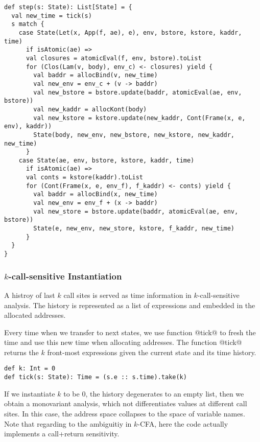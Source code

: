 \documentclass[acmsmall,review,anonymous]{acmart}\settopmatter{printfolios=true,printccs=false,printacmref=false}
\begin{document}
\begin{lstlisting}
def step(s: State): List[State] = {
  val new_time = tick(s)
  s match {
    case State(Let(x, App(f, ae), e), env, bstore, kstore, kaddr, time) 
      if isAtomic(ae) =>
      val closures = atomicEval(f, env, bstore).toList
      for (Clos(Lam(v, body), env_c) <- closures) yield {
        val baddr = allocBind(v, new_time)
        val new_env = env_c + (v -> baddr)
        val new_bstore = bstore.update(baddr, atomicEval(ae, env, bstore))
        val new_kaddr = allocKont(body)
        val new_kstore = kstore.update(new_kaddr, Cont(Frame(x, e, env), kaddr))
        State(body, new_env, new_bstore, new_kstore, new_kaddr, new_time)
      }
    case State(ae, env, bstore, kstore, kaddr, time) 
      if isAtomic(ae) =>
      val conts = kstore(kaddr).toList
      for (Cont(Frame(x, e, env_f), f_kaddr) <- conts) yield {
        val baddr = allocBind(x, new_time)
        val new_env = env_f + (x -> baddr)
        val new_store = bstore.update(baddr, atomicEval(ae, env, bstore))
        State(e, new_env, new_store, kstore, f_kaddr, new_time)
      }
  }
}
\end{lstlisting}

\subsubsection{$k$-call-sensitive Instantiation} \label{kcfainst}

A histroy of last $k$ call sites is served as time information in
$k$-call-sensitive analysis.
The history is represented as a list of expressions and embedded
in the allocated addresses.

Every time when we transfer to next states, we use function @tick@ to
fresh the time and use this new time when allocating addresses. The function
@tick@ returns the $k$ front-most expressions given the current state and its
time history.

\begin{lstlisting}
def k: Int = 0
def tick(s: State): Time = (s.e :: s.time).take(k)
\end{lstlisting}

If we instantiate $k$ to be $0$, the history degenerates to an empty list,
then we obtain a monovariant analysis, which
not differentiates values at different call sites. In this case, the address
space collapses to the space of variable names.
Note that regarding to the ambiguitiy in
$k$-CFA\cite{Gilray:2016:ACP:2951913.2951936},
here the code actually implements a call+return sensitivity.
\end{document}
